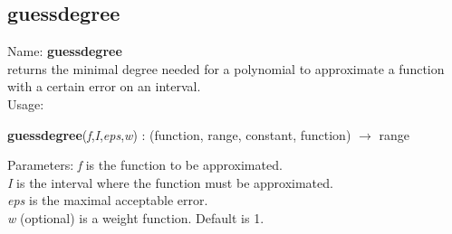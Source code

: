 \subsection{ guessdegree }
\noindent Name: \textbf{guessdegree}\\
returns the minimal degree needed for a polynomial to approximate a function with a certain error on an interval.\\

\noindent Usage: 
\begin{center}
\textbf{guessdegree}(\emph{f},\emph{I},\emph{eps},\emph{w}) : (\textsf{function}, \textsf{range}, \textsf{constant}, \textsf{function}) $\rightarrow$ \textsf{range}\\
\end{center}
Parameters: 
\emph{f} is the function to be approximated.\\
\emph{I} is the interval where the function must be approximated.\\
\emph{eps} is the maximal acceptable error.\\
\emph{w} (optional) is a weight function. Default is 1.\\

